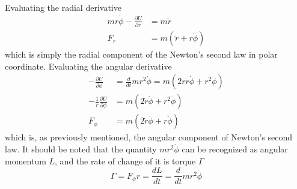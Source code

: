 \documentclass[../../../main.tex]{subfiles}
\begin{document}
Evaluating the radial derivative
\begin{align*}
  mr\dot{\phi}-\frac{\partial U}{\partial r}&=m\ddot{r}\\
  F_r&=m(\ddot{r}+r\dot{\phi})
\end{align*}
which is simply the radial component of the Newton's second law in polar coordinate. 
Evaluating the angular derivative
\begin{align*}
  -\frac{\partial U}{\partial \phi}&=\frac{d}{dt}mr^2\dot{\phi}=m(2r\dot{r}\dot{\phi}+r^2\ddot{\phi})\\
  -\frac{1}{r}\frac{\partial U}{\partial \phi}&=m(2\dot{r}\dot{\phi}+r^2\ddot{\phi})\\
  F_\phi&=m(2\dot{r}\dot{\phi}+r\ddot{\phi})
\end{align*}
which is, as previously mentioned, the angular component of Newton's second law. It should be noted that the quantity $mr^2\dot{\phi}$ can be recognized as angular momentum $L$, and the rate of change of it is torque $\Gamma$
\begin{equation*}
  \Gamma=F_\phi r=\frac{dL}{dt}=\frac{d}{dt}mr^2\dot{\phi}
\end{equation*} 
\end{document}
